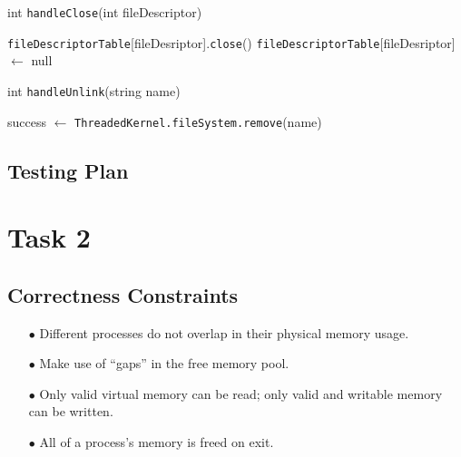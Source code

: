 \documentclass{article}
\begin{document}
\begin{spacing}{1.1}
\begin{algorithm}
  \caption{int \texttt{handleClose}(int fileDescriptor)}
\begin{algorithmic}[1]
  \ENDIF
  \STATE \texttt{fileDescriptorTable}[fileDesriptor].\texttt{close}()
  \STATE  \texttt{fileDescriptorTable}[fileDesriptor] $\leftarrow$ null
\end{algorithmic}
\end{algorithm}

\begin{algorithm}
  \caption{int \texttt{handleUnlink}(string name)}
\begin{algorithmic}[1]
  \STATE  success $\leftarrow$ \texttt{ThreadedKernel.fileSystem.remove}(name)
  \ENDIF
\end{algorithmic}
\end{algorithm}



\subsection{Testing Plan}


\section{Task 2}

\subsection{Correctness Constraints}
\begin{enumerate}
  \item[$\bullet$] Different processes do not overlap in their physical memory usage.
  \item[$\bullet$] Make use of ``gaps'' in the free memory pool.
  \item[$\bullet$] Only valid virtual memory can be read; only valid and writable
    memory can be written.
  \item[$\bullet$] All of a process's memory is freed on exit.
\end{enumerate}


\end{spacing}
\end{document}
